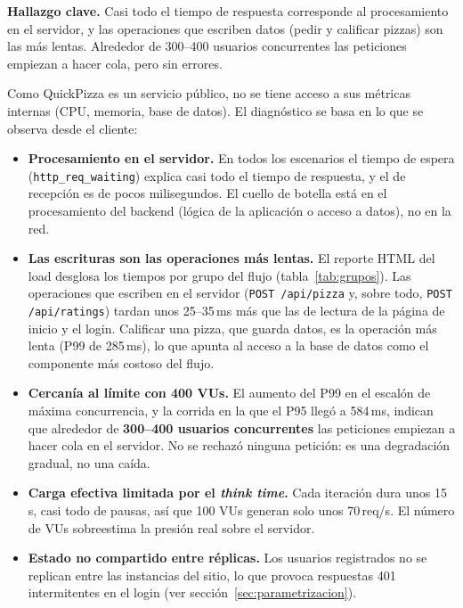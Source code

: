 \documentclass[11pt]{article}
\begin{document}
\begin{hallazgo}
{\sffamily\bfseries\color{ucbazulclaro} Hallazgo clave.} Casi todo el tiempo de respuesta
corresponde al procesamiento en el servidor, y las operaciones que escriben datos
(pedir y calificar pizzas) son las más lentas. Alrededor de 300--400 usuarios
concurrentes las peticiones empiezan a hacer cola, pero sin errores.
\end{hallazgo}

Como QuickPizza es un servicio público, no se tiene acceso a sus métricas internas
(CPU, memoria, base de datos). El diagnóstico se basa en lo que se observa desde el
cliente:

\begin{itemize}
  \item \textbf{Procesamiento en el servidor.} En todos los escenarios el tiempo de
        espera (\texttt{http\_req\_waiting}) explica casi todo el tiempo de respuesta,
        y el de recepción es de pocos milisegundos. El cuello de botella está en el
        procesamiento del backend (lógica de la aplicación o acceso a datos), no en
        la red.
  \item \textbf{Las escrituras son las operaciones más lentas.} El reporte HTML del
        load desglosa los tiempos por grupo del flujo (tabla~\ref{tab:grupos}). Las
        operaciones que escriben en el servidor (\texttt{POST /api/pizza} y, sobre
        todo, \texttt{POST /api/ratings}) tardan unos 25--35\,ms más que las de
        lectura de la página de inicio y el login. Calificar una pizza, que guarda
        datos, es la operación más lenta (P99 de 285\,ms), lo que apunta al acceso a
        la base de datos como el componente más costoso del flujo.
  \item \textbf{Cercanía al límite con 400 VUs.} El aumento del P99 en el escalón
        de máxima concurrencia, y la corrida en la que el P95 llegó a 584\,ms, indican
        que alrededor de \textbf{300--400 usuarios concurrentes} las peticiones
        empiezan a hacer cola en el servidor. No se rechazó ninguna petición: es una
        degradación gradual, no una caída.
  \item \textbf{Carga efectiva limitada por el \emph{think time}.} Cada iteración
        dura unos 15\,s, casi todo de pausas, así que 100 VUs generan solo unos
        70\,req/s. El número de VUs sobreestima la presión real sobre el servidor.
  \item \textbf{Estado no compartido entre réplicas.} Los usuarios registrados no se
        replican entre las instancias del sitio, lo que provoca respuestas 401
        intermitentes en el login (ver sección~\ref{sec:parametrizacion}).
\end{itemize}
\end{document}
